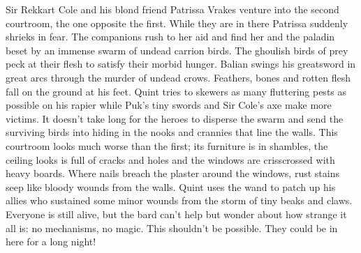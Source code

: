 Sir Rekkart Cole and his blond friend Patrissa Vrakes venture into the second courtroom, the one opposite the first. While they are in there Patrissa suddenly shrieks in fear. The companions rush to her aid and find her and the paladin beset by an immense swarm of undead carrion birds. The ghoulish birds of prey peck at their flesh to satisfy their morbid hunger. Balian swings his greatsword in great arcs through the murder of undead crows. Feathers, bones and rotten flesh fall on the ground at his feet. Quint tries to skewers as many fluttering pests as possible on his rapier while Puk's tiny swords and Sir Cole's axe make more victims. It doesn't take long for the heroes to disperse the swarm and send the surviving birds into hiding in the nooks and crannies that line the walls. This courtroom looks much worse than the first; its furniture is in shambles, the ceiling looks is full of cracks and holes and the windows are crisscrossed with heavy boards. Where nails breach the plaster around the windows, rust stains seep like bloody wounds from the walls. Quint uses the wand to patch up his allies who sustained some minor wounds from the storm of tiny beaks and claws. Everyone is still alive, but the bard can't help but wonder about how strange it all is: no mechanisms, no magic. This shouldn't be possible. They could be in here for a long night!\\

